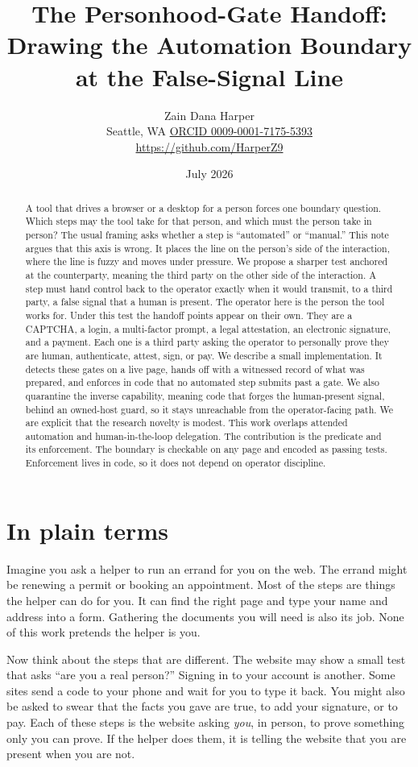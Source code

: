 \documentclass[11pt]{article}
\title{\textbf{The Personhood-Gate Handoff: Drawing the Automation Boundary at the False-Signal Line}}
\author{Zain Dana Harper\\[2pt]\small Seattle, WA \quad\textbar\quad \href{https://orcid.org/0009-0001-7175-5393}{ORCID 0009-0001-7175-5393}\\[2pt]\small\url{https://github.com/HarperZ9}}
\date{July 2026}
\begin{document}
\maketitle
\begin{abstract}
A tool that drives a browser or a desktop for a person forces one boundary question. Which steps may the tool take for that person, and which must the person take in person? The usual framing asks whether a step is ``automated'' or ``manual.'' This note argues that this axis is wrong. It places the line on the person's side of the interaction, where the line is fuzzy and moves under pressure. We propose a sharper test anchored at the counterparty, meaning the third party on the other side of the interaction. A step must hand control back to the operator exactly when it would transmit, to a third party, a false signal that a human is present. The operator here is the person the tool works for. Under this test the handoff points appear on their own. They are a CAPTCHA, a login, a multi-factor prompt, a legal attestation, an electronic signature, and a payment. Each one is a third party asking the operator to personally prove they are human, authenticate, attest, sign, or pay. We describe a small implementation. It detects these gates on a live page, hands off with a witnessed record of what was prepared, and enforces in code that no automated step submits past a gate. We also quarantine the inverse capability, meaning code that forges the human-present signal, behind an owned-host guard, so it stays unreachable from the operator-facing path. We are explicit that the research novelty is modest. This work overlaps attended automation and human-in-the-loop delegation. The contribution is the predicate and its enforcement. The boundary is checkable on any page and encoded as passing tests. Enforcement lives in code, so it does not depend on operator discipline.
\end{abstract}

\section*{In plain terms}
Imagine you ask a helper to run an errand for you on the web. The errand might be renewing a permit or booking an appointment. Most of the steps are things the helper can do for you. It can find the right page and type your name and address into a form. Gathering the documents you will need is also its job. None of this work pretends the helper is you.

Now think about the steps that are different. The website may show a small test that asks ``are you a real person?'' Signing in to your account is another. Some sites send a code to your phone and wait for you to type it back. You might also be asked to swear that the facts you gave are true, to add your signature, or to pay. Each of these steps is the website asking \emph{you}, in person, to prove something only you can prove. If the helper does them, it is telling the website that you are present when you are not.
\end{document}
